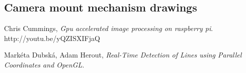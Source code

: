 \documentclass[paper=A4, fontsize=11pt, titlepage]{article}
\numberwithin{equation}{section}
\numberwithin{figure}{section}
\numberwithin{table}{section}
\begin{document}
\subsection{Camera mount mechanism drawings}



\clearpage

\begin{thebibliography}{9}
	Chris Cummings,
	\emph{Gpu accelerated image processing on raspberry pi}. http://youtu.be/yQZISXIFjaQ

	Markéta Dubská, Adam Herout,
	\emph{Real-Time Detection of Lines using Parallel Coordinates and OpenGL}. 

\end{thebibliography}
\end{document}
